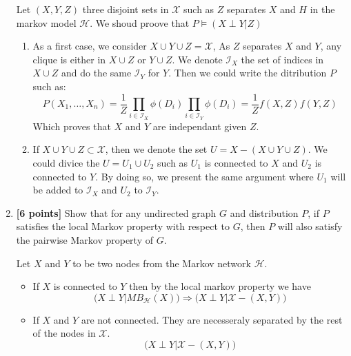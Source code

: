 \documentclass[12pt]{article}
\newcommand{\Ical}{\mathcal{I}}
\newcommand{\Hcal}{\mathcal{H}}
\newcommand{\Xcal}{\mathcal{X}}
\begin{document}
\begin{enumerate}
      \begin{solution}
        Let $(X,Y,Z)$ three disjoint sets in $\Xcal$ such as $Z$
        separates $X$ and $H$ in the markov model $\Hcal$. We shoud
        proove that $P \models (X \perp Y|Z)$

      \begin{enumerate}
        \item As a first case, we consider $X\cup Y \cup Z=\Xcal$, As
          $Z$ separates $X$ and $Y$,  any clique is either in $X\cup Z$ or
          $Y\cup Z$. We denote $\Ical_X$ the set of indices in
          $X\cup Z$ and do the same $\Ical_Y$ for $Y$. Then we could
          write the ditribution $P$ such as:
          \[
            P(X_1,\ldots,X_n) = \frac{1}{Z}
            \prod_{i\in\Ical_X}\phi(D_i)\prod_{i\in\Ical_Y}\phi(D_i)=
            \frac{1}{Z}f(X,Z)f(Y,Z)
          \]
          Which proves that $X$ and $Y$ are independant given $Z$.
        \item If $X\cup Y \cup Z \subset \Xcal$, then we denote the
          set $U = X - (X \cup Y \cup Z)$. We could divice the $U=U_1
          \cup U_2$ such as $U_1$ is connected to $X$ and $U_2$ is
          connected to $Y$. By doing so, we present the same
          argument where $U_1$ will be added to $\Ical_X$ and $U_2$
          to $\Ical_Y$.
      \end{enumerate}
      \end{solution}
    \item \textbf{[6 points]} Show that for any undirected graph $G$ and distribution $P$, if $P$ satisfies the local Markov property with respect to $G$, then $P$ will also satisfy the pairwise Markov property of $G$.

      \begin{solution}
       Let $X$ and $Y$ to be two nodes from the Markov network
       $\Hcal$. 

       \begin{itemize}
         \item If $X$ is connected to $Y$ then by the local markov
           property we have
           \[
             \big(X \perp Y| MB_{\Hcal}(X)) \Longrightarrow (X \perp Y
             | \Xcal - (X,Y)\big)
           \]
          \item If $X$ and $Y$ are not connected. They are necesseraly
            separated by the rest of the nodes in $\Xcal$.
            \[
              \big(X\perp Y | \Xcal - (X,Y)\big)
            \]
       \end{itemize}
      \end{solution}
\end{enumerate}
\end{document}
